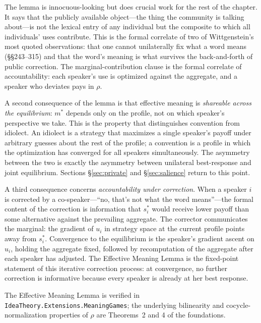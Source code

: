The lemma is innocuous-looking but does crucial work for the rest of
the chapter. It says that the publicly available object---the thing the
community is talking about---is not the lexical entry of any individual
but the composite to which all individuals' uses contribute. This is the
formal correlate of two of Wittgenstein's most quoted observations:
that one cannot unilaterally fix what a word means
(\S\S243--315) and that the word's meaning is what survives the
back-and-forth of public correction. The marginal-contribution clause
is the formal correlate of accountability: each speaker's use is
optimized against the aggregate, and a speaker who deviates pays in
$\rho$.

A second consequence of the lemma is that effective meaning is
\emph{shareable across the equilibrium}: $m^\ast$ depends only on the
profile, not on which speaker's perspective we take. This is the
property that distinguishes convention from idiolect. An idiolect is a
strategy that maximizes a single speaker's payoff under arbitrary
guesses about the rest of the profile; a convention is a profile in
which the optimization has converged for all speakers simultaneously.
The asymmetry between the two is exactly the asymmetry between
unilateral best-response and joint equilibrium. Sections
\S\ref{sec:private} and \S\ref{sec:salience} return to this point.

A third consequence concerns \emph{accountability under correction}.
When a speaker $i$ is corrected by a co-speaker---``no, that's not
what the word means''---the formal content of the correction is
information that $s^\ast_i$ would receive lower payoff than some
alternative against the prevailing aggregate. The corrector communicates
the marginal: the gradient of $u_i$ in strategy space at the current
profile points away from $s^\ast_i$. Convergence to the equilibrium is
the speaker's gradient ascent on $u_i$, holding the aggregate fixed,
followed by recomputation of the aggregate after each speaker has
adjusted. The Effective Meaning Lemma is the fixed-point statement of
this iterative correction process: at convergence, no further correction
is informative because every speaker is already at her best response.

\formalstatus The Effective Meaning Lemma is verified in
\texttt{IdeaTheory.Extensions.MeaningGames}; the underlying bilinearity
and cocycle-normalization properties of $\rho$ are Theorems~2 and 4 of
the foundations.

